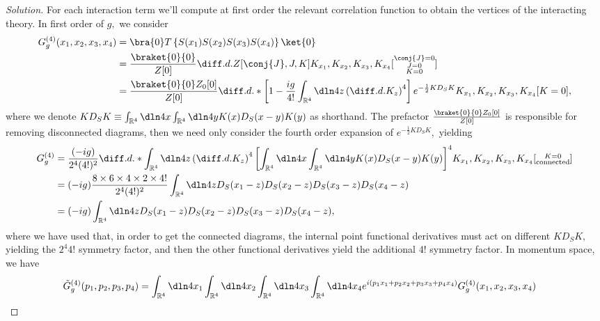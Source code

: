 \begin{proof}[Solution]
   For each interaction term we'll compute at first order the relevant correlation function to obtain the vertices of the interacting theory. In first order of \(g,\) we consider
   \begin{align*}
      G_g^{(4)}(x_1, x_2, x_3,x_4) &= \bra{0}T\left\{S(x_1)S(x_2) S(x_3)S(x_4)\right\}\ket{0}\\
                                   &= \frac{\braket{0}{0}}{Z[0]} \diff.d.{Z[\conj{J}, J, K]}{K_{x_1},K_{x_2},K_{x_3},K_{x_4}}[\substack{\conj{J} = 0\\J=0\\K=0}]\\
                                   &= \frac{\braket{0}{0} Z_0[0]}{Z[0]}\diff.d.*{\left[1 - \frac{ig}{4!}\int_{\mathbb{R}^4}{\dln4z \left(\diff.d.{}{K_z}\right)^4}\right]e^{-\frac12 KD_SK}}{K_{x_1},K_{x_2},K_{x_3},K_{x_4}}[K=0],
   \end{align*}
   where we denote \(KD_SK \equiv \int_{\mathbb{R}^4} \dln4x \int_{\mathbb{R}^4} \dln4y K(x) D_S(x-y) K(y)\) as shorthand. The prefactor \(\frac{\braket{0}{0} Z_0[0]}{Z[0]}\) is responsible for removing disconnected diagrams, then we need only consider the fourth order expansion of \(e^{-\frac12 KD_SK},\) yielding
   \begin{align*}
      G_g^{(4)} &= \frac{(-ig)}{2^4(4!)^2} \diff.d.*{ \int_{\mathbb{R}^4}\dln4z \left(\diff.d.{}{K_z}\right)^4 \left[\int_{\mathbb{R}^4} \dln4x \int_{\mathbb{R}^4} \dln4y K(x)D_S(x - y)K(y)\right]^4 }{K_{x_1},K_{x_2},K_{x_3},K_{x_4}}[\substack{K=0\\\text{connected}}]\\
                &= (-ig)\frac{8 \times 6 \times 4 \times 2 \times 4!}{2^4 (4!)^2} \int_{\mathbb{R}^4} \dln4z D_S(x_1 - z) D_S(x_2 - z) D_S(x_3 - z) D_S(x_4 - z)\\
                &= (-ig) \int_{\mathbb{R}^4} \dln4z D_S(x_1 - z) D_S(x_2 - z) D_S(x_3 - z) D_S(x_4 - z),
   \end{align*}
   where we have used that, in order to get the connected diagrams, the internal point functional derivatives must act on different \(KD_SK,\) yielding the \(2^4 4!\) symmetry factor, and then the other functional derivatives yield the additional \(4!\) symmetry factor. In momentum space, we have
   \begin{align*}
      \tilde{G}_g^{(4)}(p_1, p_2, p_3, p_4) &= \int_{\mathbb{R}^4} \dln4{x_1}\int_{\mathbb{R}^4} \dln4{x_2}\int_{\mathbb{R}^4} \dln4{x_3}\int_{\mathbb{R}^4} \dln4{x_4}e^{i(p_1 x_1 + p_2 x_2 + p_3x_3 + p_4 x_4)} G^{(4)}_g(x_1, x_2,x_3,x_4)

\end{align*}
\end{proof}
